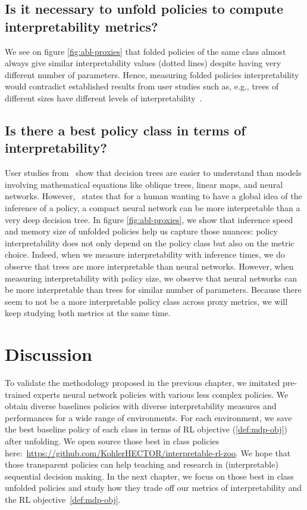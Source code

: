 \subsection{Is it necessary to unfold policies to compute interpretability metrics?}
We see on figure \ref{fig:abl-proxies} that folded policies of the same class almost always give similar interpretability values (dotted lines) despite having very different number of parameters.
Hence, measuring folded policies interpretability would contradict established results from user studies such as, e.g., trees of different sizes have different levels of interpretability~\cite{study-4}. 

\subsection{Is there a best policy class in terms of interpretability?}
User studies from~\cite{study-1,study-2,study-3} show that decision trees are easier to understand than models involving mathematical equations like oblique trees, linear maps, and neural networks.
However,~\cite{lipton} states that for a human wanting to have a global idea of the inference of a policy, a compact neural network can be more interpretable than a very deep decision tree.
In figure \ref{fig:abl-proxies}, we show that inference speed and memory size of unfolded policies help us capture those nuances: policy interpretability does not only depend on the policy class but also on the metric choice.
Indeed, when we measure interpretability with inference times, we do observe that trees are more interpretable than neural networks.
However, when measuring interpretability with policy size, we observe that neural networks can be more interpretable than trees for similar number of parameters.
Because there seem to not be a more interpretable policy class across proxy metrics, we will keep studying both metrics at the same time.

\section{Discussion}
To validate the methodology proposed in the previous chapter, we imitated pre-trained experts neural network policies with various less complex policies.
We obtain diverse baselines policies with diverse interpretability measures and performances for a wide range of environments.
For each environment, we save the best baseline policy of each class in terms of RL objective (\ref{def:mdp-obj}) after unfolding.
We open source those best in class policies here:~\url{https://github.com/KohlerHECTOR/interpretable-rl-zoo}.
We hope that those transparent policies can help teaching and research in (interpretable) sequential decision making.
In the next chapter, we focus on those best in class unfolded policies and study how they trade off our metrics of interpretability and the RL objective~\ref{def:mdp-obj}.
